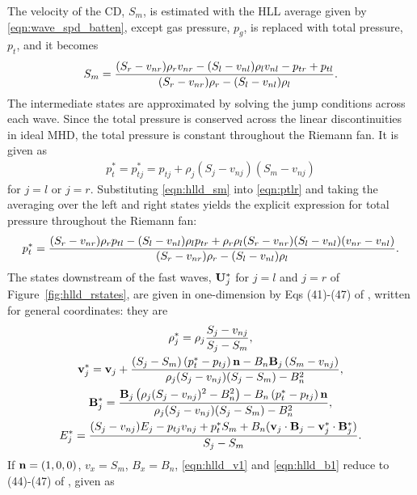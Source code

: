 The velocity of the CD, $S_m$, is estimated with the HLL average given by \eqref{eqn:wave_spd_batten}, except gas pressure, $p_g$, is replaced with total pressure, $p_t$, and it becomes  
\begin{gather}
\label{eqn:hlld_sm}
S_m = \frac{(S_r - v_{nr})\rho_r v_{nr} - (S_l - v_{nl})\rho_l v_{nl} - p_{tr} + p_{tl} }
{(S_r - v_{nr})\rho_r  - (S_l - v_{nl})\rho_l}.
\end{gather}     
The intermediate states are approximated by solving the jump conditions across each wave.  Since the total pressure is conserved across the linear discontinuities in ideal MHD, the total pressure is constant throughout the Riemann fan.  It is given as 
\begin{gather}
\label{eqn:ptlr}
p_{t}^* = p_{tj}^* = p_{tj} + \rho_j (S_j - v_{nj})(S_m - v_{nj})
\end{gather}
for $j=l$ or $j=r$.  Substituting \eqref{eqn:hlld_sm} into \eqref{eqn:ptlr} and taking the averaging over the left and right states yields the explicit expression for total pressure throughout the Riemann fan:
\begin{gather}
\label{eqn:hlld_pt1}
p^*_{t} = \frac{(S_r - v_{nr})\rho_r p_{tl} - (S_l - v_{nl})\rho_l p_{tr} 
          + \rho_r\rho_l(S_r - v_{nr})(S_l - v_{nl})(v_{nr} - v_{nl})}{(S_r - v_{nr})\rho_r - (S_l - v_{nl})\rho_l}.
\end{gather} 
 The states downstream of the fast waves, $\mathbf{U}^*_j$ for $j=l$ and $j=r$ of Figure~\ref{fig:hlld_rstates}, are given in one-dimension by Eqs (41)-(47) of \citep{Miyoshi:2005}, written for general coordinates: they are
\begin{gather}
\label{eqn:hlld_d1}
\rho^*_j = \rho_j \frac{S_j - v_{nj}}{S_j - S_m} , \\
\label{eqn:hlld_v1}
\mathbf{v}^*_{j} = \mathbf{v}_{j} + \frac{\left(S_j - S_m\right)\left(p_{t}^* - p_{tj}\right)\mathbf{n} 
  - B_n\mathbf{B}_{j} \left(S_m - v_{nj}\right) }
               {\rho_j(S_j - v_{nj})(S_j - S_m) - B_n^2} , \\
\label{eqn:hlld_b1}
\mathbf{B}^*_{j} = \frac{\mathbf{B}_{j} \left(\rho_j(S_j - v_{nj})^2 - B_n^2\right) 
  - B_n\left(p_{t}^* - p_{tj}\right)\mathbf{n}}
                {\rho_j(S_j - v_{nj})(S_j - S_m) - B_n^2} , \\
\label{eqn:hlld_en1}
E^*_j = \frac{(S_j - v_{nj})E_j - p_{tj}v_{nj} + p^*_{t}S_m + B_n(\mathbf{v}_{j}\cdot\mathbf{B}_{j} 
        - \mathbf{v}^*_{j}\cdot\mathbf{B}^*_{j})}{S_j - S_m} .
\end{gather}
If $\mathbf{n} = (1,0,0)$, $v_x = S_m$, $B_x = B_n$, \eqref{eqn:hlld_v1} and \eqref{eqn:hlld_b1} reduce to (44)-(47) of \citep{Miyoshi:2005}, given as  
